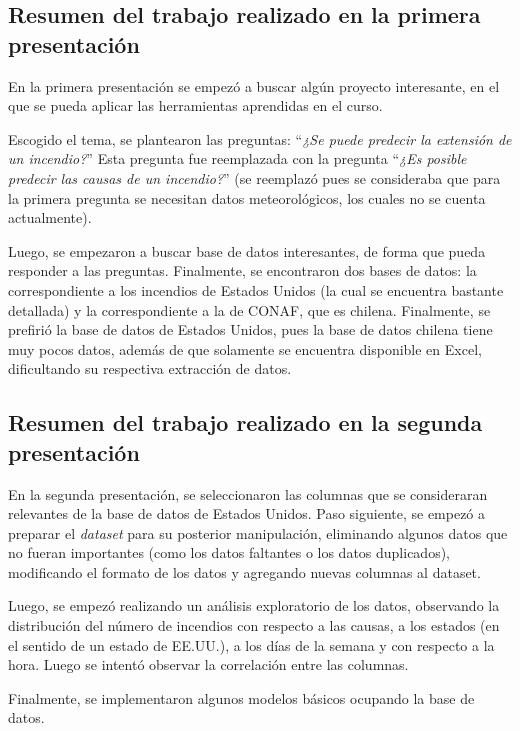 \subsection{Resumen del trabajo realizado en la primera presentación}
En la primera presentación se empezó a buscar algún proyecto interesante, en el que se pueda aplicar las herramientas aprendidas en el curso. 

Escogido el tema, se plantearon las preguntas: ``\textit{¿Se puede predecir la extensión de un incendio?}'' Esta pregunta fue reemplazada con la pregunta ``\textit{¿Es posible predecir las causas de un incendio?}'' (se reemplazó pues se consideraba que para la primera pregunta se necesitan datos meteorológicos, los cuales no se cuenta actualmente).

Luego, se empezaron a buscar base de datos interesantes, de forma que pueda responder a las preguntas. Finalmente, se encontraron dos bases de datos: la correspondiente a los incendios de Estados Unidos (la cual se encuentra bastante detallada) y la correspondiente a la de CONAF, que es chilena. Finalmente, se prefirió la base de datos de Estados Unidos, pues la base de datos chilena tiene muy pocos datos, además de que solamente se encuentra disponible en Excel, dificultando su respectiva extracción de datos.

\subsection{Resumen del trabajo realizado en la segunda presentación}
En la segunda presentación, se seleccionaron las columnas que se consideraran relevantes de la base de datos de Estados Unidos. Paso siguiente, se empezó a preparar el \textit{dataset} para su posterior manipulación, eliminando algunos datos que no fueran importantes (como los datos faltantes o los datos duplicados), modificando el formato de los datos y agregando nuevas columnas al dataset.

Luego, se empezó realizando un análisis exploratorio de los datos, observando la distribución del número de incendios con respecto a las causas, a los estados (en el sentido de un estado de EE.UU.), a los días de la semana y con respecto a la hora. Luego se intentó observar la correlación entre las columnas.

Finalmente, se implementaron algunos modelos básicos ocupando la base de datos.